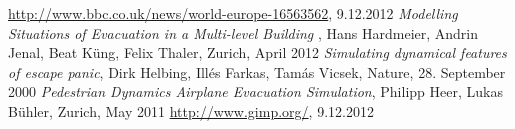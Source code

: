 \documentclass[11pt]{article}
\begin{document}
\begingroup 
\renewcommand{\section}[2]{}%
\begin{thebibliography}{9}

		\url{http://www.bbc.co.uk/news/world-europe-16563562}, 9.12.2012
	\emph{Modelling Situations of Evacuation
in a Multi-level Building} , 
Hans Hardmeier, Andrin Jenal, Beat Küng, Felix Thaler, Zurich, April 2012
		\emph{Simulating dynamical features of escape panic},
		Dirk Helbing, Ill\'es Farkas, Tam\'as Vicsek, Nature, 28. September 2000
		\emph{Pedestrian Dynamics Airplane Evacuation Simulation},
		Philipp Heer, Lukas Bühler, Zurich, May 2011
		\url{http://www.gimp.org/}, 9.12.2012
\end{thebibliography}
\endgroup
\end{document}
